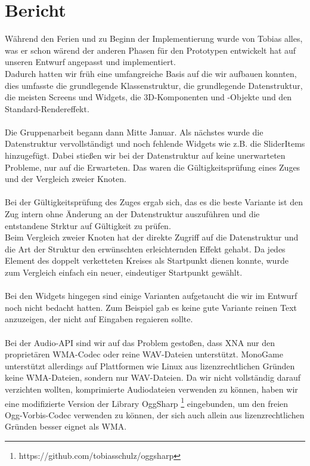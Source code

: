 \chapter{Bericht}
Während den Ferien und zu Beginn der Implementierung wurde von Tobias alles, was er schon wärend der anderen Phasen für den Prototypen entwickelt hat auf unseren Entwurf angepasst und implementiert.
\\
Dadurch hatten wir früh eine umfangreiche Basis auf die wir aufbauen konnten, dies umfasste die grundlegende Klassenstruktur, die grundlegende Datenstruktur, die meisten Screens und Widgets, die 3D-Komponenten und -Objekte und den Standard-Rendereffekt.
\\\\
Die Gruppenarbeit begann dann Mitte Januar.
Als nächstes wurde die Datenstruktur vervollständigt und noch fehlende Widgets wie z.B. die SliderItems hinzugefügt.
Dabei stießen wir bei der Datenstruktur auf keine unerwarteten Probleme, nur auf die Erwarteten.
Das waren die Gültigkeitsprüfung eines Zuges und der Vergleich zweier Knoten.
\\\\
Bei der Gültigkeitsprüfung des Zuges ergab sich, das es die beste Variante ist den Zug intern ohne Änderung an der Datenstruktur auszuführen und die entstandene Strktur auf Gültigkeit zu prüfen.
\\
Beim Vergleich zweier Knoten hat der direkte Zugriff auf die Datenstruktur und die Art der Struktur den erwünschten erleichternden Effekt gehabt. Da jedes Element des doppelt verketteten Kreises als Startpunkt dienen konnte, wurde zum Vergleich einfach ein neuer, eindeutiger Startpunkt gewählt.
\\\\
Bei den Widgets hingegen sind einige Varianten aufgetaucht die wir im Entwurf noch nicht bedacht hatten. Zum Beispiel gab es keine gute Variante reinen Text anzuzeigen, der nicht auf Eingaben regaieren sollte.
\\\\
Bei der Audio-API sind wir auf das Problem gestoßen, dass XNA nur den proprietären WMA-Codec oder reine WAV-Dateien unterstützt. MonoGame unterstützt allerdings auf Plattformen wie Linux aus lizenzrechtlichen Gründen keine WMA-Dateien, sondern nur WAV-Dateien. Da wir nicht vollständig darauf verzichten wollten, komprimierte Audiodateien verwenden zu können, haben wir eine modifizierte Version der Library OggSharp \footnote{https://github.com/tobiasschulz/oggsharp} eingebunden, um den freien Ogg-Vorbis-Codec verwenden zu können, der sich auch allein aus lizenzrechtlichen Gründen besser eignet als WMA.

